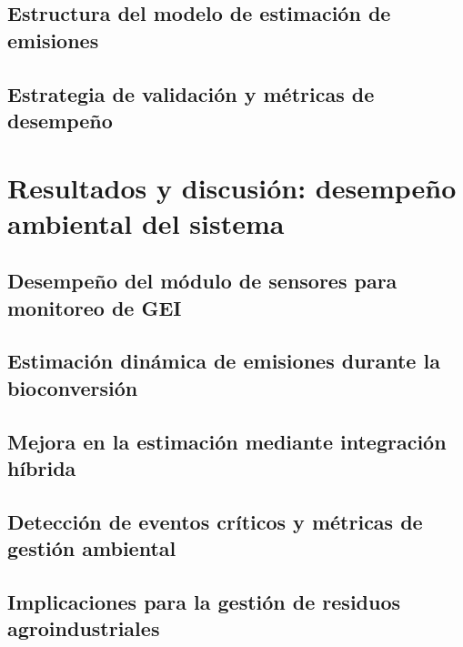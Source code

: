 \documentclass[10pt,spanish,fleqn,openany,twoside,letterpaper]{book}
\begin{document}
\section{Estructura del modelo de estimación de emisiones}
% 

\section{Estrategia de validación y métricas de desempeño}
% 

\chapter{Resultados y discusión: desempeño ambiental del sistema}

\section{Desempeño del módulo de sensores para monitoreo de GEI}
% 

\section{Estimación dinámica de emisiones durante la bioconversión}
% 

\section{Mejora en la estimación mediante integración híbrida}
% 

\section{Detección de eventos críticos y métricas de gestión ambiental}
% 

\section{Implicaciones para la gestión de residuos agroindustriales}
% 
\end{document}
